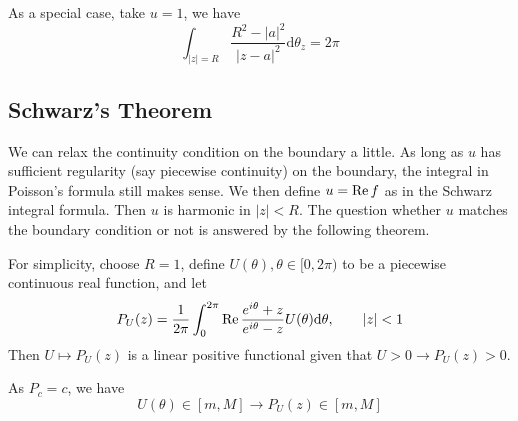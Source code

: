 \documentclass[../main.tex]{subfiles}
\begin{document}
As a special case, take $u=1$, we have
\begin{equation}
	\int_{\left|z\right|=R} \frac{R^2-\left|a\right|^2}{\left|z-a\right|^2} \mathrm{d} \theta_z = 2 \pi
\end{equation}

\subsection{Schwarz's Theorem}

We can relax the continuity condition on the boundary a little. As long as $u$ has sufficient regularity (say piecewise continuity) on the boundary, the integral in Poisson's formula still makes sense. We then define $u = \operatorname{Re} f$ as in the Schwarz integral formula. Then $u$ is harmonic in $\left|z\right|<R$. The question whether $u$ matches the boundary condition or not is answered by the following theorem.

For simplicity, choose $R=1$, define $U(\theta), \theta\in [0, 2 \pi)$ to be a piecewise continuous real function, and let
\begin{equation}
	P_U(z) = \frac{1}{2 \pi} \int_0^{2 \pi} \operatorname{Re} \frac{e^{i \theta}+z}{e^{i \theta}-z} U(\theta) \mathrm{d} \theta, \qquad \left|z\right|<1
\end{equation}
Then $U \mapsto P_U(z)$ is a linear positive functional given that $U>0 \rightarrow P_U(z)>0$.

As $P_c=c$, we have
\begin{equation}\label{eq:Bound of Schwarz's Theorem}
	U(\theta)\in [m,M] \rightarrow P_U(z)\in [m,M]
\end{equation}
\end{document}
